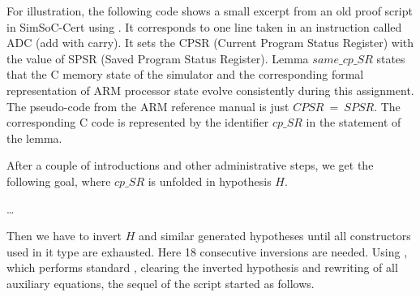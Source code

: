 
For illustration,
the following code shows a small excerpt from an old proof script in
SimSoC-Cert using \inversion. 
It corresponds to one line taken in an instruction called ADC (add with carry).
It sets the CPSR (Current Program Status Register) with the value of SPSR 
(Saved Program Status Register). 
Lemma $same\_cp\_SR$ states that 
the C memory state of the simulator and 
the corresponding formal representation of ARM processor state 
evolve consistently during this assignment.
The pseudo-code from the ARM reference manual is just $CPSR~=~SPSR$.
The corresponding C code is represented by the identifier $cp\_SR$ 
in the statement of the lemma.


\medskip\noindent
After a couple of introductions and other administrative steps,
we get the following goal,  
where $cp\_SR$ is unfolded in hypothesis $H$.


\medskip
\dots \\
\hspace*{-1.7mm}

\noindent
Then we have to invert $H$ and similar generated hypotheses
until all constructors used in it type are exhausted. 
Here 18 consecutive inversions are needed.
Using \inv, which performs standard \inversion, clearing 
the inverted hypothesis and rewriting of all auxiliary equations,
the sequel of the script started as follows.

